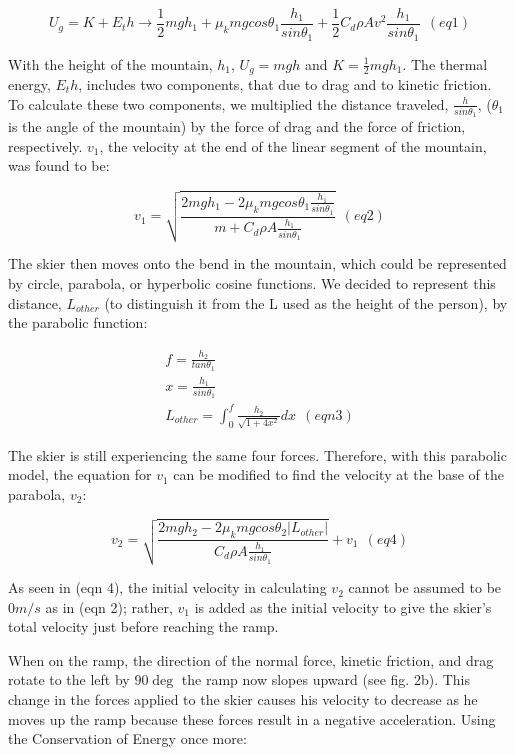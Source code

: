 \documentclass[]{IEEEphot}
\begin{document}
\[
	U_g = K + E_th \rightarrow \frac{1}{2}mgh_1 + \mu_k mgcos\theta_1 \frac{h_1}{sin\theta_1} + \frac{1}{2}C_d\rho Av^2 \frac{h_1}{sin\theta_1}   \ \         (eq 1)
\]

With the height of the mountain, $h_1$, $U_g = mgh$ and $K = \frac{1}{2} mgh_1$. The thermal energy, $E_th$, includes two components, that due to drag and to kinetic friction. To calculate these two components, we multiplied the distance traveled, $\frac{h}{sin\theta_1}$, ($\theta_1$ is the angle of the mountain)  by the force of drag and the force of friction, respectively. $v_1$, the velocity at the end of the linear segment of the mountain, was found to be:

\[
	v_1 = \sqrt{\frac{2mgh_1 - 2\mu_k mgcos\theta_1 \frac{h_1}{sin\theta_1}}{m + C_d\rho A\frac{h_1}{sin\theta_1}}} \ \ (eq 2)
\]

The skier then moves onto the bend in the mountain, which could be represented by circle, parabola, or hyperbolic cosine functions. We decided to represent this distance, $L_{other}$ (to distinguish it from the L used as the height of the person), by the parabolic function:

\begin{eqnarray}
f = \frac{h_2}{tan\theta_1}\nonumber\\
x = \frac{h_1}{sin\theta_1} \nonumber\\
L_{other} = \int_0^f \frac{h_2}{\sqrt{1 + 4x^2}} dx \ \ (eqn 3) \nonumber
\end{eqnarray}

The skier is still experiencing the same four forces. Therefore, with this parabolic model, the equation for $v_1$ can be modified to find the velocity at the base of the parabola, $v_2$:

\[
	v_2 = \sqrt{\frac{2mgh_2 - 2\mu_k mgcos\theta_2 \left|L_{other}\right| }{C_d\rho A\frac{h_1}{sin\theta_1}}} + v_1\ \ (eq 4)
\]

As seen in (eqn 4), the initial velocity in calculating $v_2$ cannot be assumed to be $0 m/s$ as in (eqn 2); rather, $v_1$ is added as the initial velocity to give the skier’s total velocity just before reaching the ramp.

When on the ramp, the direction of the normal force, kinetic friction, and drag rotate to the left by $90\deg$ the ramp now slopes upward (see fig. 2b). This change in the forces applied to the skier causes his velocity to decrease as he moves up the ramp because these forces result in a negative acceleration. Using the Conservation of Energy once more:
\end{document}
